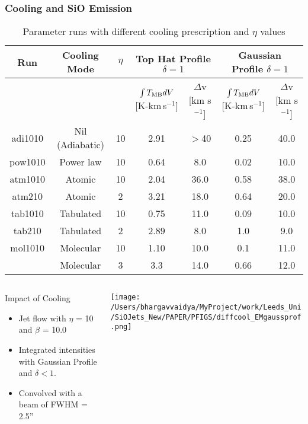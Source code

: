 \documentclass[8pt,xcolor=dvipsnames]{beamer}
\begin{document}
\begin{frame}[t]
\frametitle{Cooling and SiO Emission}
\tiny{
\begin{table}
\caption{Parameter runs with different cooling prescription and $\eta$ values}
\begin{tabular}{c | c | c | c | c | c | c }
\hline
Run & Cooling Mode & $\eta$ & \multicolumn{2}{|c|}{Top Hat Profile
  $\delta = 1$} & \multicolumn{2}{|c|}{Gaussian Profile $\delta =
  1$}\\
\hline\hline
&&& $\int T_{\rm MB}dV$ [K-km\,s$^{-1}$] & $\Delta$v [km s$^{-1}$] & $\int T_{\rm MB}dV$ [K-km\,s$^{-1}$] & $\Delta$v [km s$^{-1}$] \\
\hline
adi1010 & Nil (Adiabatic) & 10 & 2.91 & $>$40 & 0.25 & 40.0 \\
pow1010 & Power law & 10 & 0.64 & 8.0 & 0.02 & 10.0\\
atm1010 & Atomic & 10 & 2.04 & 36.0 & 0.58 & 38.0 \\
atm210 & Atomic & 2 & 3.21 & 18.0 & 0.64 & 20.0 \\
tab1010 & Tabulated & 10 & 0.75 & 11.0 & 0.09 & 10.0 \\
tab210 & Tabulated & 2 & 2.89 & 8.0 & 1.0 & 9.0 \\
mol1010 & Molecular & 10 & 1.10 & 10.0 & 0.1 & 11.0 \\
\color{red}{\textbf{mol310}} & Molecular & 3 & 3.3 & 14.0 & 0.66 & 12.0\\
\hline
\end{tabular}
\end{table}
}
\vskip10pt
\begin{columns}[T]

\begin{column}{0.3\textwidth}
  \begin{block}{Impact of Cooling}
    \begin{itemize}
      \item Jet flow with $\eta$ = 10 and $\beta$ = 10.0\\
      \item Integrated intensities with Gaussian Profile
        and $\delta < 1$.\\
      \item Convolved with a beam of FWHM = 2.5''
    \end{itemize}
  \end{block}
\end{column}

\begin{column}{0.7\textwidth}
 \texttt{[image: /Users/bhargavvaidya/MyProject/work/Leeds\_Uni/SiOJets\_New/PAPER/PFIGS/diffcool\_EMgaussprof.png]}
\end{column}
\end{columns}
\end{frame}
\end{document}
